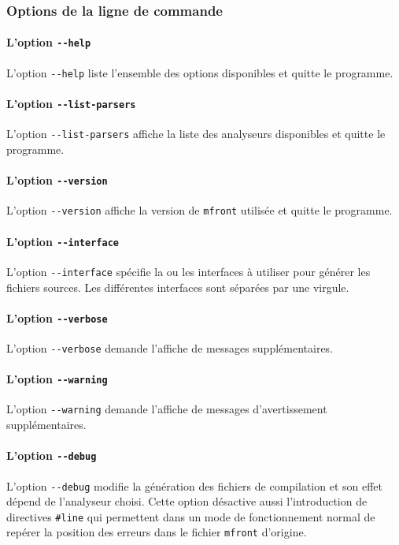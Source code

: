 \documentclass[rectoverso,pleiades,pstricks,leqno,anti]{texmf/note_technique_2010}
\newcommand{\mfront}{\texttt{mfront}}
\newcommand{\moption}[1]{\texttt{-{}-#1}}
\begin{document}
\subsubsection{Options de la ligne de commande}

\paragraph{L'option \moption{help}} L'option \moption{help} liste
l'ensemble des options disponibles et quitte le programme.

\paragraph{L'option \moption{list-parsers}} L'option
\moption{list-parsers} affiche la liste des analyseurs disponibles et
quitte le programme.

\paragraph{L'option \moption{version}} L'option \moption{version}
affiche la version de \mfront{} utilisée et quitte le programme.

\paragraph{L'option \moption{interface}} L'option \moption{interface}
spécifie la ou les interfaces à utiliser pour générer les fichiers
sources. Les différentes interfaces sont séparées par une virgule.

\paragraph{L'option \moption{verbose}} L'option \moption{verbose}
demande l'affiche de messages supplémentaires.

\paragraph{L'option \moption{warning}} L'option \moption{warning}
demande l'affiche de messages d'avertissement supplémentaires.

\paragraph{L'option \moption{debug}} L'option \moption{debug} modifie la
génération des fichiers de compilation et son effet dépend de
l'analyseur choisi. Cette option désactive aussi l'introduction de
directives \texttt{\#line} qui permettent dans un mode de fonctionnement
normal de repérer la position des erreurs dans le fichier \mfront{}
d'origine.
\end{document}
